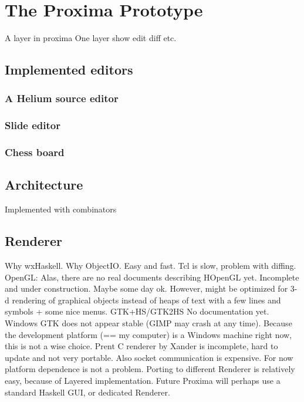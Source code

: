 \chapter{The Proxima Prototype}

A layer in proxima
One layer
show edit diff etc. 

\section{Implemented editors}

\subsection{A Helium source editor}
\subsection{Slide editor}
\subsection{Chess board}

\section{Architecture}

Implemented with combinators






\section{Renderer}
Why wxHaskell.
Why ObjectIO. 
Easy and fast.
Tcl is slow, problem with diffing. 
OpenGL: Alas, there are no real documents describing HOpenGL yet. Incomplete and under construction. Maybe some day ok. However, might be optimized for 3-d rendering of graphical objects instead of heaps of text with a few lines and symbols + some nice menus.
GTK+HS/GTK2HS No documentation yet. Windows GTK does not appear stable (GIMP may crash at any time). Because the development platform (== my computer) is a Windows machine right now, this is not a wise choice.
Prent C renderer by Xander is incomplete, hard to update and not very portable. Also socket communication is expensive.
For now platform dependence is not a problem.
Porting to different Renderer is relatively easy, because of Layered implementation.
Future Proxima will perhaps use a standard Haskell GUI, or dedicated Renderer.


